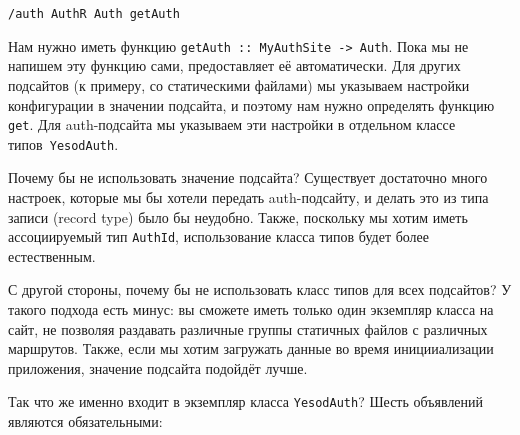 \begin{lstlisting}
/auth AuthR Auth getAuth
\end{lstlisting}

Нам нужно иметь функцию \lstinline'getAuth :: MyAuthSite -> Auth'. Пока мы не
напишем эту функцию сами,
предоставляет её автоматически. Для других подсайтов (к примеру, со
статическими файлами) мы указываем настройки конфигурации в значении подсайта,
и поэтому нам нужно определять функцию \lstinline'get'. Для auth-подсайта мы
указываем эти настройки в отдельном классе типов~\lstinline'YesodAuth'.

\begin{remark}
    Почему бы не использовать значение подсайта? Существует достаточно много
    настроек, которые мы бы хотели передать auth-подсайту, и делать это из типа
    записи (record type) было бы неудобно. Также, поскольку мы хотим иметь
    ассоциируемый тип \lstinline'AuthId', использование класса типов будет
    более естественным.

    С другой стороны, почему бы не использовать класс типов для всех подсайтов?
    У такого подхода есть минус: вы сможете иметь только один экземпляр класса
    на сайт, не позволяя раздавать различные группы статичных файлов с
    различных маршрутов. Также, если мы хотим загружать данные во время
    иницииализации приложения, значение подсайта подойдёт лучше.
\end{remark}

Так что же именно входит в экземпляр класса \lstinline'YesodAuth'? Шесть
объявлений являются обязательными:

